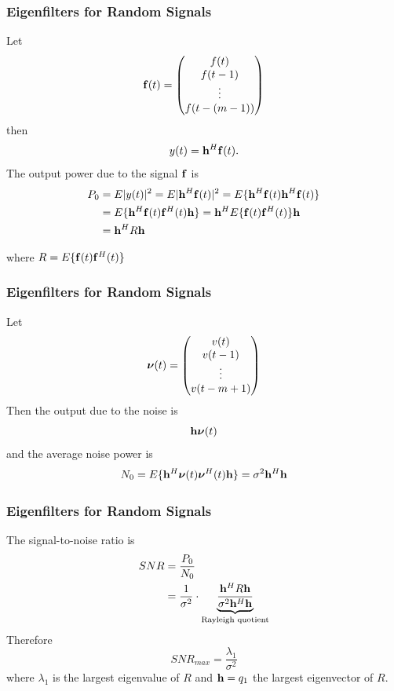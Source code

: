 \documentclass{beamer}
\begin{document}
\begin{frame}\frametitle{Eigenfilters for Random Signals}
	Let
	\[
		\mathbf{f}(t) 
			= \begin{pmatrix}
	    		f(t)\\
	    		f(t-1)\\
	    		\vdots\\
	    		f(t-(m-1))
	  		  \end{pmatrix}
	\]
	then
	\[ 
		y(t) = \mathbf{h}^H \mathbf{f}(t).
	\]
	The output power due to the signal $\mathbf{f}$ is 
	\begin{align*}
		P_0 
		&= E|y(t)|^2 = E|\mathbf{h}^H\mathbf{f}(t)|^2 = E\{\mathbf{h}^H\mathbf{f}(t)\mathbf{h}^H\mathbf{f}(t)\}\\
		&= E\{\mathbf{h}^H\mathbf{f}(t)\mathbf{f}^H(t)\mathbf{h}\}= \mathbf{h}^HE\{\mathbf{f}(t)\mathbf{f}^H(t)\}\mathbf{h}\\
		&= \mathbf{h}^HR\mathbf{h}
	\end{align*}
	
	where $R = E\{\mathbf{f}(t) \mathbf{f}^H(t)\} $
\end{frame}

\begin{frame}\frametitle{Eigenfilters for Random Signals}
	Let 
	\[ 
		\boldsymbol{\nu}(t) 
			= \begin{pmatrix}
	    		v(t)\\
	    		v(t-1)\\
	    		\vdots
	    		\\
	    		v(t-m+1)
	  		  \end{pmatrix}
	\]
	Then the output due to the noise is
	\[ 
		\mathbf{h}\boldsymbol{\nu}(t) 
	\]
	and the average noise power is
	\[ 
		N_0 = E\{\mathbf{h}^H\boldsymbol{\nu}(t)\boldsymbol{\nu}^H(t)\mathbf{h}\} 
		    = \sigma^2\mathbf{h}^H\mathbf{h} 
	\]
\end{frame}

\begin{frame}\frametitle{Eigenfilters for Random Signals}
	The signal-to-noise ratio is
	\begin{align*}
		SNR &= \frac{P_0}{N_0} \\
		    &= \frac{1}{\sigma^2} \cdot
		    	\underbrace{
		    		\frac{\mathbf{h}^HR\mathbf{h}}{\sigma^2\mathbf{h}^H\mathbf{h}}
		    	}_{\text{Rayleigh quotient}} 
	\end{align*}
	Therefore
	\[ 
		SNR_{max} = \frac{\lambda_1}{\sigma^2} 
	\]
	where $\lambda_1$ is the largest eigenvalue of $R$ and $\mathbf{h} = q_1$ the largest eigenvector of $R$.
\end{frame}
\end{document}
